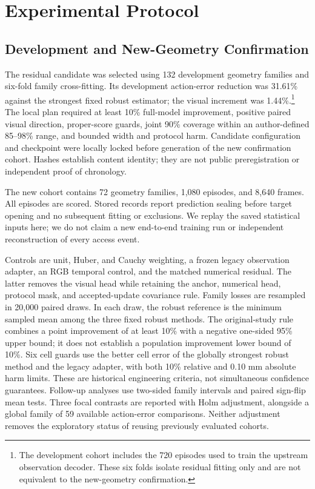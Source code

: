 \documentclass{ieeeaccess}
\begin{document}
\section{Experimental Protocol}\label{sec:protocol}
\subsection{Development and New-Geometry Confirmation}
The residual candidate was selected using 132 development geometry families and six-fold family cross-fitting. Its development action-error reduction was 31.61\% against the strongest fixed robust estimator; the visual increment was 1.44\%.\footnote{The development cohort includes the 720 episodes used to train the upstream observation decoder. These six folds isolate residual fitting only and are not equivalent to the new-geometry confirmation.} The local plan required at least 10\% full-model improvement, positive paired visual direction, proper-score guards, joint 90\% coverage within an author-defined 85--98\% range, and bounded width and protocol harm. Candidate configuration and checkpoint were locally locked before generation of the new confirmation cohort. Hashes establish content identity; they are not public preregistration or independent proof of chronology.

The new cohort contains 72 geometry families, 1,080 episodes, and 8,640 frames. All episodes are scored. Stored records report prediction sealing before target opening and no subsequent fitting or exclusions. We replay the saved statistical inputs here; we do not claim a new end-to-end training run or independent reconstruction of every access event.

Controls are unit, Huber, and Cauchy weighting, a frozen legacy observation adapter, an RGB temporal control, and the matched numerical residual. The latter removes the visual head while retaining the anchor, numerical head, protocol mask, and accepted-update covariance rule. Family losses are resampled in 20,000 paired draws. In each draw, the robust reference is the minimum sampled mean among the three fixed robust methods. The original-study rule combines a point improvement of at least 10\% with a negative one-sided 95\% upper bound; it does not establish a population improvement lower bound of 10\%. Six cell guards use the better cell error of the globally strongest robust method and the legacy adapter, with both 10\% relative and 0.10 mm absolute harm limits. These are historical engineering criteria, not simultaneous confidence guarantees. Follow-up analyses use two-sided family intervals and paired sign-flip mean tests. Three focal contrasts are reported with Holm adjustment, alongside a global family of 59 available action-error comparisons. Neither adjustment removes the exploratory status of reusing previously evaluated cohorts.
\end{document}
